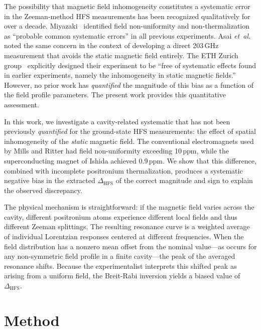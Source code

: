 \documentclass[twocolumn,pra,aps,superscriptaddress,floatfix,10pt]{revtex4-2}
\begin{document}
The possibility that magnetic field inhomogeneity constitutes a systematic error in the Zeeman-method HFS measurements has been recognized qualitatively for over a decade. Miyazaki~\cite{Miyazaki2010} identified field non-uniformity and non-thermalization as ``probable common systematic errors'' in all previous experiments. Asai \textit{et~al.}~\cite{Asai2012} noted the same concern in the context of developing a direct 203\,GHz measurement that avoids the static magnetic field entirely. The ETH Zurich group~\cite{Heiss2018} explicitly designed their experiment to be ``free of systematic effects found in earlier experiments, namely the inhomogeneity in static magnetic fields.'' However, no prior work has \emph{quantified} the magnitude of this bias as a function of the field profile parameters. The present work provides this quantitative assessment.

In this work, we investigate a cavity-related systematic that has not been previously \emph{quantified} for the ground-state HFS measurements: the effect of spatial inhomogeneity of the \emph{static} magnetic field. The conventional electromagnets used by Mills and Ritter had field non-uniformity exceeding 10\,ppm, while the superconducting magnet of Ishida achieved 0.9\,ppm. We show that this difference, combined with incomplete positronium thermalization, produces a systematic negative bias in the extracted $\Delta_\mathrm{HFS}$ of the correct magnitude and sign to explain the observed discrepancy.

The physical mechanism is straightforward: if the magnetic field varies across the cavity, different positronium atoms experience different local fields and thus different Zeeman splittings. The resulting resonance curve is a weighted average of individual Lorentzian responses centered at different frequencies. When the field distribution has a nonzero mean offset from the nominal value---as occurs for any non-symmetric field profile in a finite cavity---the peak of the averaged resonance shifts. Because the experimentalist interprets this shifted peak as arising from a uniform field, the Breit-Rabi inversion yields a biased value of $\Delta_\mathrm{HFS}$.

\section{Method}
\label{sec:method}
\end{document}
